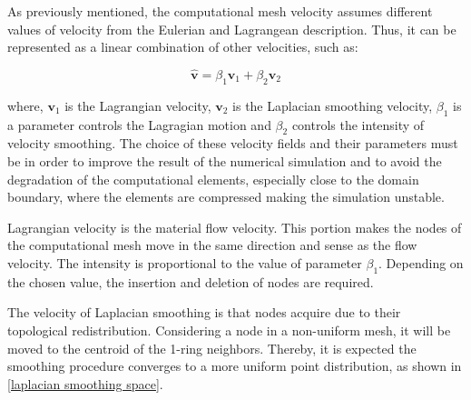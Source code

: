 As previously mentioned, the computational mesh velocity assumes 
different values of velocity from the Eulerian and Lagrangean 
description. Thus, it can be represented as a linear 
combination of other velocities, such as:

\begin{equation} \label{mesh velocity eq}
\hat{\textbf{v}} 
= \beta_{1} \textbf{v}_{1}
+ \beta_{2} \textbf{v}_{2}
\end{equation}

\medskip
\noindent
where,
$\textbf{v}_{1}$ is the Lagrangian velocity,
$\textbf{v}_{2}$ is the Laplacian smoothing velocity,
$\beta_{1}$ is a parameter controls the Lagragian motion and
$\beta_{2}$ controls the intensity of velocity smoothing.
The choice of these velocity fields and their parameters must 
be in order to improve the result of the numerical 
simulation and to avoid the degradation of the 
computational elements, especially close to the domain boundary, 
where the elements are compressed making the simulation unstable.

\medskip
Lagrangian velocity is the material flow velocity. 
This portion makes the nodes of the computational 
mesh move in the same direction and sense as the flow velocity. 
The intensity is proportional to the value of parameter $\beta_{1}$.
Depending on the chosen value, the insertion and deletion 
of nodes are required.

\medskip
The velocity of Laplacian smoothing is that nodes 
acquire due to their topological redistribution. 
Considering a node in a non-uniform mesh, it will be 
moved to the centroid of the 1-ring neighbors. 
Thereby, it is expected the smoothing procedure
converges to a more uniform point distribution,
as shown in \ref{laplacian smoothing space}.

